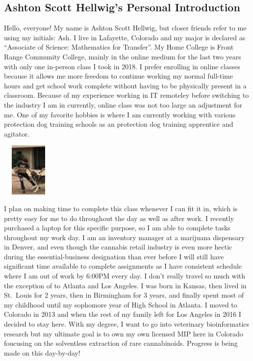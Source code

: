 \documentclass[stu,12pt]{apa7}
\begin{document}
    \newpage
    \subsection*{Ashton Scott Hellwig's Personal Introduction}
      Hello, everyone! My name is Ashton Scott Hellwig, but closer friends refer
        to me using my initials: Ash. I live in Lafayette, Colorado and my major
        is declared as ``Associate of Science: Mathematics for Transfer''. My
        Home College is Front Range Community College, mainly in the online
        medium for the last two years with only one in-person class I took in
        2018. I prefer enrolling in online classes because it allows me more
        freedom to continue working my normal full-time hours and get school
        work complete without having to be physically present in a classroom.
        Because of my experience working in IT remoteley before switching to
        the industry I am in currently, online class was not too large an
        adjustment for me. One of my favorite hobbies is where I am currently
        working with various protection dog training schools as an protection
        dog training apprentice and agitator.

        \includegraphics[height=100px,width=100px]{KojackBiteWork1}

        I plan on making time to complete this class whenever I can fit it in,
        which is pretty easy for me to do throughout the day as well as after
        work. I recently purchased a laptop for this specific purpose, so I am
        able to complete tasks throughout my work day. I am an inventory manager
        at a marijuana dispensary in Denver, and even though the cannabis
        retail industry is even more hectic during the essential-business
        designation than ever before I will still have significant time
        available to complete assignments as I have consistent schedule where I
        am out of work by 6:00PM every day. I don't really travel so much with
        the exception of to Atlanta and Los Angeles. I was born in Kansas, then
        lived in St.\ Louis for 2 years, then in Birmingham for 3 years, and
        finally spent most of my childhood until my sophomore year of High
        School in Atlanta. I moved to Colorado in 2013 and when the rest of my
        family left for Los Angeles in 2016 I decided to stay here. With my
        degree, I want to go into veterinary bioinformatics research but my
        ultimate goal is to own my own licensed MIP here in Colorado foucusing
        on the solventless extraction of rare cannabinoids. Progress is being
        made on this day-by-day!
\end{document}
